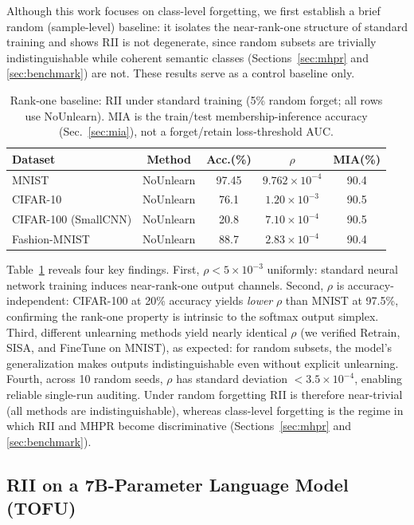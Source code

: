 \documentclass[smallextended]{svjour3}       %
\begin{document}
Although this work focuses on class-level forgetting, we first establish a brief random (sample-level) baseline: it isolates the near-rank-one structure of standard training and shows RII is not degenerate, since random subsets are trivially indistinguishable while coherent semantic classes (Sections~\ref{sec:mhpr} and \ref{sec:benchmark}) are not. These results serve as a control baseline only.

\begin{table}[t]
\centering
\small
\caption{Rank-one baseline: RII under standard training (5\% random forget; all rows use NoUnlearn). MIA is the train/test membership-inference accuracy (Sec.~\ref{sec:mia}), not a forget/retain loss-threshold AUC.}\label{tab:main}
\setlength{\tabcolsep}{2pt}
\begin{tabular}{l c c c c}
\toprule
Dataset & Method & Acc.(\%) & $\rho$ & MIA(\%) \\
\midrule
MNIST & NoUnlearn & 97.45 & $9.762\times10^{-4}$ & 90.4 \\
CIFAR-10 & NoUnlearn & 76.1 & $1.20\times10^{-3}$ & 90.5 \\
CIFAR-100 (SmallCNN) & NoUnlearn & 20.8 & $7.10\times10^{-4}$ & 90.5 \\
Fashion-MNIST & NoUnlearn & 88.7 & $2.83\times10^{-4}$ & 90.4 \\
\bottomrule
\end{tabular}
\end{table}

Table~\ref{tab:main} reveals four key findings. First, $\rho<5\times10^{-3}$ uniformly: standard neural network training induces near-rank-one output channels. Second, $\rho$ is accuracy-independent: CIFAR-100 at 20\% accuracy yields \emph{lower} $\rho$ than MNIST at 97.5\%, confirming the rank-one property is intrinsic to the softmax output simplex. Third, different unlearning methods yield nearly identical $\rho$ (we verified Retrain, SISA, and FineTune on MNIST), as expected: for random subsets, the model's generalization makes outputs indistinguishable even without explicit unlearning. Fourth, across 10 random seeds, $\rho$ has standard deviation $<3.5\times10^{-4}$, enabling reliable single-run auditing. Under random forgetting RII is therefore near-trivial (all methods are indistinguishable), whereas class-level forgetting is the regime in which RII and MHPR become discriminative (Sections~\ref{sec:mhpr} and \ref{sec:benchmark}).

\subsection{RII on a 7B-Parameter Language Model (TOFU)}
\label{sec:llm}
\end{document}
